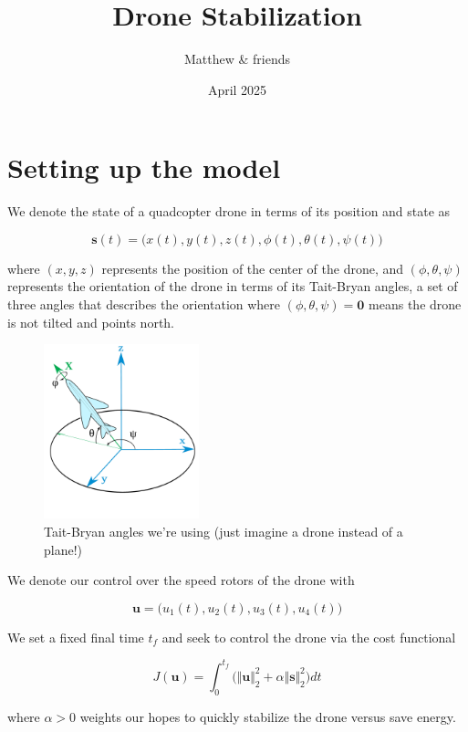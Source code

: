 \documentclass{article}
\title{Drone Stabilization}
\author{Matthew \& friends}
\date{April 2025}
\begin{document}
\maketitle

\section*{Setting up the model}
We denote the state of a quadcopter drone in terms of its position and state as 

$$
\mathbf{s}(t) = \big(x(t), y(t), z(t), \phi(t), \theta(t), \psi(t) \big)
$$

where $(x, y, z)$ represents the position of the center of the drone, and $(\phi, \theta, \psi)$ represents the orientation of the drone in terms of its Tait-Bryan angles, a set of three angles that describes the orientation where $(\phi, \theta, \psi) = \mathbf{0}$ means the drone is not tilted and points north.

\begin{figure}[h]
    \centering
    \includegraphics[width=0.4\textwidth]{Plane_with_ENU_embedded_axes.pdf}
    \caption{Tait-Bryan angles we're using (just imagine a drone instead of a plane!)}
\end{figure}

We denote our control over the speed rotors of the drone with 

$$
\mathbf{u} = \big(u_1(t), u_2(t), u_3(t), u_4(t)\big)
$$



We set a fixed final time $t_f$ and seek to control the drone via the cost functional

$$
J(\mathbf{u}) = \int_{0}^{t_f}\Big( \Vert \mathbf{u} \Vert_2^2 + \alpha \Vert \mathbf{s} \Vert_2^2 \Big) dt
$$

where $\alpha > 0$ weights our hopes to quickly stabilize the drone versus save energy.
\end{document}
